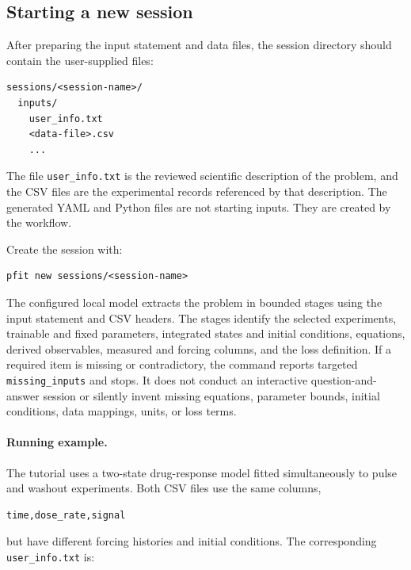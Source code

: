 
\subsection{Starting a new session}

After preparing the input statement and data files, the session directory should
contain the user-supplied files:

\begin{verbatim}
sessions/<session-name>/
  inputs/
    user_info.txt
    <data-file>.csv
    ...
\end{verbatim}

The file \texttt{user\_info.txt} is the reviewed scientific description of the
problem, and the CSV files are the experimental records referenced by that
description. The generated YAML and Python files are not starting inputs. They
are created by the workflow.

Create the session with:

\begin{verbatim}
pfit new sessions/<session-name>
\end{verbatim}

The configured local model extracts the problem in bounded stages using the
input statement and CSV headers. The stages identify the selected experiments,
trainable and fixed parameters, integrated states and initial conditions,
equations, derived observables, measured and forcing columns, and the loss
definition. If a required item is missing or contradictory, the command reports
targeted \texttt{missing\_inputs} and stops. It does not conduct an interactive
question-and-answer session or silently invent missing equations, parameter
bounds, initial conditions, data mappings, units, or loss terms.

\paragraph{Running example.}
The tutorial uses a two-state drug-response model fitted simultaneously to pulse
and washout experiments. Both CSV files use the same columns,

\begin{verbatim}
time,dose_rate,signal
\end{verbatim}

but have different forcing histories and initial conditions. The corresponding
\texttt{user\_info.txt} is:

